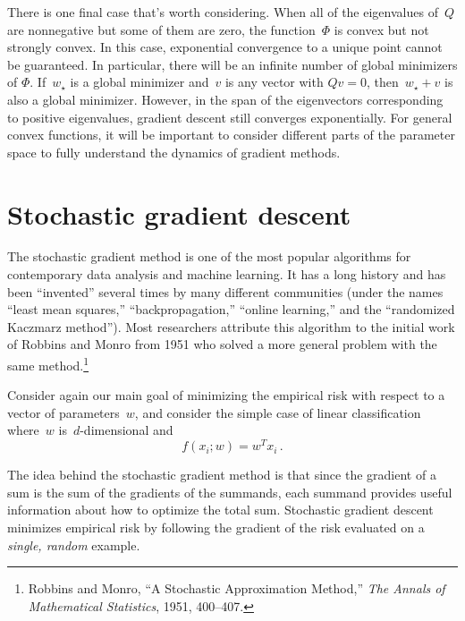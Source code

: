 \documentclass{tufte-book}
\begin{document}
There is one final case that's worth considering. When all of the
eigenvalues of~\(Q\) are nonnegative but some of them are zero, the
function~\(\Phi\) is convex but not strongly convex. In this case,
exponential convergence to a unique point cannot be guaranteed. In
particular, there will be an infinite number of global minimizers of
\(\Phi\). If~\(w_\star\) is a global minimizer and~\(v\) is any vector
with \(Qv=0\), then~\(w_\star+v\) is also a global minimizer. However,
in the span of the eigenvectors corresponding to positive eigenvalues,
gradient descent still converges exponentially. For general convex
functions, it will be important to consider different parts of the
parameter space to fully understand the dynamics of gradient methods.

\hypertarget{stochastic-gradient-descent}{%
\section{Stochastic gradient
descent}\label{stochastic-gradient-descent}}

The stochastic gradient method is one of the most popular algorithms for
contemporary data analysis and machine learning. It has a long history
and has been ``invented'' several times by many different communities
(under the names ``least mean squares,'' ``backpropagation,'' ``online
learning,'' and the ``randomized Kaczmarz method''). Most researchers
attribute this algorithm to the initial work of Robbins and Monro from
1951 who solved a more general problem with the same method.\footnote{Robbins
  and Monro, {``A Stochastic Approximation Method,''} \emph{The Annals
  of Mathematical Statistics}, 1951, 400--407.}

Consider again our main goal of minimizing the empirical risk with
respect to a vector of parameters~\(w\), and consider the simple case of
linear classification where~\(w\) is~\(d\)-dimensional and \[
f(x_i;w) = w^Tx_i\,.
\]

The idea behind the stochastic gradient method is that since the
gradient of a sum is the sum of the gradients of the summands, each
summand provides useful information about how to optimize the total sum.
Stochastic gradient descent minimizes empirical risk by following the
gradient of the risk evaluated on a \emph{single, random} example.
\end{document}
